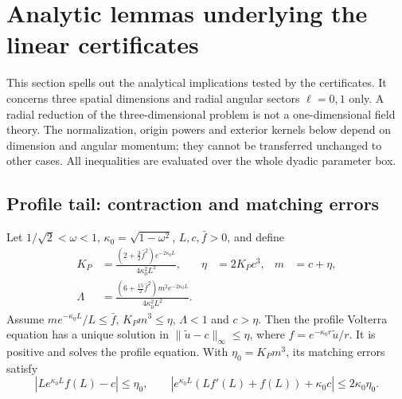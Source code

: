 \section{Analytic lemmas underlying the linear certificates}
\label{supp:proof-lemmas}
This section spells out the analytical implications tested by the
certificates. It concerns three spatial dimensions and radial angular
sectors $\ell=0,1$ only. A radial reduction of the three-dimensional
problem is not a one-dimensional field theory. The normalization,
origin powers and exterior kernels below depend on dimension and
angular momentum; they cannot be transferred unchanged to other cases.
All inequalities are evaluated over the whole dyadic parameter box.

\subsection{Profile tail: contraction and matching errors}
\label{supp:profile-tail}
Let $1/\sqrt2<\omega<1$, $\kappa_0=\sqrt{1-\omega^2}$, $L,c,\bar f>0$,
and define
\begin{align}
 K_P&=\frac{(2+\tfrac32\bar f^2)e^{-2\kappa_0L}}{4\kappa_0^2L^2},
 &\eta&=2K_Pc^3,&m&=c+\eta,\nonumber\\
 \Lambda&=\frac{(6+\tfrac{15}{2}\bar f^2)m^2e^{-2\kappa_0L}}
                   {4\kappa_0^2L^2}.&&&
 \label{eq:proof-profile-constants}
\end{align}
Assume $m e^{-\kappa_0L}/L\leq\bar f$, $K_Pm^3\leq\eta$,
$\Lambda<1$ and $c>\eta$. Then the profile Volterra equation has a
unique solution in $\|\widetilde u-c\|_\infty\leq\eta$,
where $f=e^{-\kappa_0r}\widetilde u/r$. It is positive and solves the
profile equation. With $\eta_0=K_Pm^3$, its matching errors satisfy
\begin{equation}
 |Le^{\kappa_0L}f(L)-c|\leq\eta_0,\qquad
 |e^{\kappa_0L}(Lf'(L)+f(L))+\kappa_0c|\leq2\kappa_0\eta_0.
 \label{supp:profile-errors}
\end{equation}

